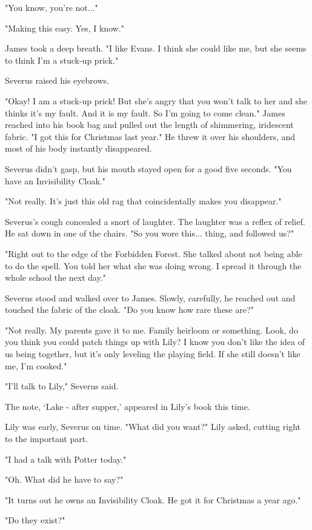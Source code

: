 "You know, you're not..."

"Making this easy. Yes, I know."

James took a deep breath. "I like Evans. I think she could like me, but she seems to think I'm a stuck-up prick."

Severus raised his eyebrows.

"Okay! I am a stuck-up prick! But she's angry that you won't talk to her and she thinks it's my fault. And it is my fault. So I'm going to come clean." James reached into his book bag and pulled out the length of shimmering, iridescent fabric. "I got this for Christmas last year." He threw it over his shoulders, and most of his body instantly disappeared.

Severus didn't gasp, but his mouth stayed open for a good five seconds. "You have an Invisibility Cloak."

"Not really. It's just this old rag that coincidentally makes you disappear."

Severus's cough concealed a snort of laughter. The laughter was a reflex of relief. He sat down in one of the chairs. "So you wore this... thing, and followed us?"

"Right out to the edge of the Forbidden Forest. She talked about not being able to do the spell. You told her what she was doing wrong. I spread it through the whole school the next day."

Severus stood and walked over to James. Slowly, carefully, he reached out and touched the fabric of the cloak. "Do you know how rare these are?"

"Not really. My parents gave it to me. Family heirloom or something. Look, do you think you could patch things up with Lily? I know you don't like the idea of us being together, but it's only leveling the playing field. If she still doesn't like me, I'm cooked."

"I'll talk to Lily," Severus said.

The note, `Lake - after supper,' appeared in Lily's book this time.

Lily was early, Severus on time. "What did you want?" Lily asked, cutting right to the important part.

"I had a talk with Potter today."

"Oh. What did he have to say?"

"It turns out he owns an Invisibility Cloak. He got it for Christmas a year ago."

"Do they exist?"


